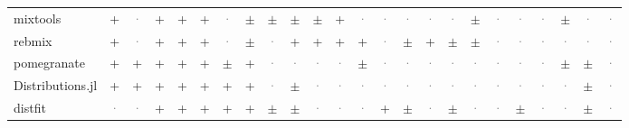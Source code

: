 \documentclass[10pt,a4paper]{article}
\begin{document}
\begin{landscape}
{\begin{longtable}{@{}l *{23}{c}@{}}
mixtools & \cellcolor{yes!35}+ & \textcolor{gray}{·} & \cellcolor{yes!35}+ & \cellcolor{yes!35}+ & \cellcolor{yes!35}+ & \textcolor{gray}{·} & \cellcolor{part!45}$\pm$ & \cellcolor{part!45}$\pm$ & \cellcolor{part!45}$\pm$ & \cellcolor{part!45}$\pm$ & \cellcolor{yes!35}+ & \textcolor{gray}{·} & \textcolor{gray}{·} & \textcolor{gray}{·} & \textcolor{gray}{·} & \textcolor{gray}{·} & \cellcolor{part!45}$\pm$ & \textcolor{gray}{·} & \textcolor{gray}{·} & \textcolor{gray}{·} & \cellcolor{part!45}$\pm$ & \textcolor{gray}{·} & \textcolor{gray}{·} \\
rebmix & \cellcolor{yes!35}+ & \textcolor{gray}{·} & \cellcolor{yes!35}+ & \cellcolor{yes!35}+ & \cellcolor{yes!35}+ & \textcolor{gray}{·} & \cellcolor{part!45}$\pm$ & \textcolor{gray}{·} & \cellcolor{yes!35}+ & \cellcolor{yes!35}+ & \cellcolor{yes!35}+ & \cellcolor{yes!35}+ & \textcolor{gray}{·} & \cellcolor{part!45}$\pm$ & \cellcolor{yes!35}+ & \cellcolor{part!45}$\pm$ & \cellcolor{part!45}$\pm$ & \textcolor{gray}{·} & \textcolor{gray}{·} & \textcolor{gray}{·} & \textcolor{gray}{·} & \textcolor{gray}{·} & \textcolor{gray}{·} \\
pomegranate & \cellcolor{yes!35}+ & \cellcolor{yes!35}+ & \cellcolor{yes!35}+ & \cellcolor{yes!35}+ & \cellcolor{yes!35}+ & \cellcolor{part!45}$\pm$ & \cellcolor{yes!35}+ & \textcolor{gray}{·} & \textcolor{gray}{·} & \textcolor{gray}{·} & \textcolor{gray}{·} & \cellcolor{part!45}$\pm$ & \textcolor{gray}{·} & \textcolor{gray}{·} & \textcolor{gray}{·} & \textcolor{gray}{·} & \textcolor{gray}{·} & \textcolor{gray}{·} & \textcolor{gray}{·} & \textcolor{gray}{·} & \cellcolor{part!45}$\pm$ & \cellcolor{part!45}$\pm$ & \textcolor{gray}{·} \\
Distributions.jl & \cellcolor{yes!35}+ & \cellcolor{yes!35}+ & \cellcolor{yes!35}+ & \cellcolor{yes!35}+ & \cellcolor{yes!35}+ & \cellcolor{yes!35}+ & \cellcolor{yes!35}+ & \textcolor{gray}{·} & \cellcolor{part!45}$\pm$ & \textcolor{gray}{·} & \textcolor{gray}{·} & \textcolor{gray}{·} & \textcolor{gray}{·} & \textcolor{gray}{·} & \textcolor{gray}{·} & \textcolor{gray}{·} & \textcolor{gray}{·} & \textcolor{gray}{·} & \textcolor{gray}{·} & \textcolor{gray}{·} & \textcolor{gray}{·} & \cellcolor{part!45}$\pm$ & \textcolor{gray}{·} \\
distfit & \textcolor{gray}{·} & \textcolor{gray}{·} & \cellcolor{yes!35}+ & \cellcolor{yes!35}+ & \cellcolor{yes!35}+ & \cellcolor{yes!35}+ & \cellcolor{yes!35}+ & \cellcolor{part!45}$\pm$ & \cellcolor{part!45}$\pm$ & \textcolor{gray}{·} & \textcolor{gray}{·} & \textcolor{gray}{·} & \cellcolor{yes!35}+ & \cellcolor{part!45}$\pm$ & \textcolor{gray}{·} & \cellcolor{part!45}$\pm$ & \textcolor{gray}{·} & \textcolor{gray}{·} & \cellcolor{part!45}$\pm$ & \textcolor{gray}{·} & \textcolor{gray}{·} & \cellcolor{part!45}$\pm$ & \textcolor{gray}{·} \\

\end{longtable}}
\end{landscape}
\end{document}
